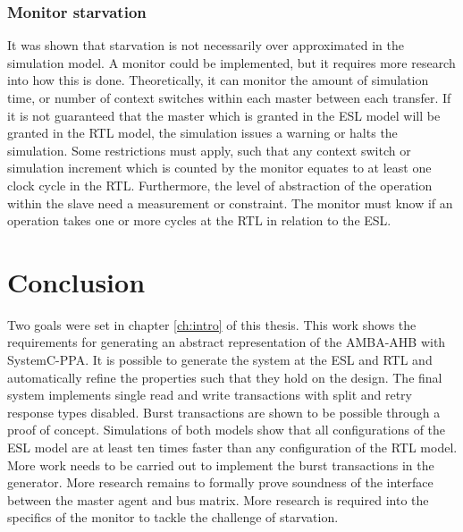 \subsubsection{Monitor starvation}
It was shown that starvation is not necessarily over approximated in the simulation model. A monitor could be implemented, but it requires more research into how this is done. Theoretically, it can monitor the amount of simulation time, or number of context switches within each master between each transfer.
If it is not guaranteed that the master which is granted in the ESL model will be granted in the RTL model, the simulation issues a warning or halts the simulation. Some restrictions must apply, such that any context switch or simulation increment which is counted by the monitor equates to at least one clock cycle in the RTL. Furthermore, the level of abstraction of the operation within the slave need a measurement or constraint. The monitor must know if an operation
takes one or more cycles at the RTL in relation to the ESL.   


\section{Conclusion}
\label{sec:concl}
Two goals were set in chapter \ref{ch:intro} of this thesis. This work shows the requirements for generating an abstract representation of the AMBA-AHB with SystemC-PPA. It is possible to generate the system at the ESL and RTL and automatically refine the properties such that they hold on the design. The final system implements single read and write transactions with split and retry response types disabled. Burst transactions are shown to be possible through a proof of concept. Simulations of both models show that all configurations of the ESL model are at least ten times faster than any configuration of the RTL model. More work needs to be carried out to implement the burst transactions in the generator. More research remains to formally prove soundness of the interface between the master agent and bus matrix. More research is required into the specifics of the monitor to tackle the challenge of starvation. 






     




